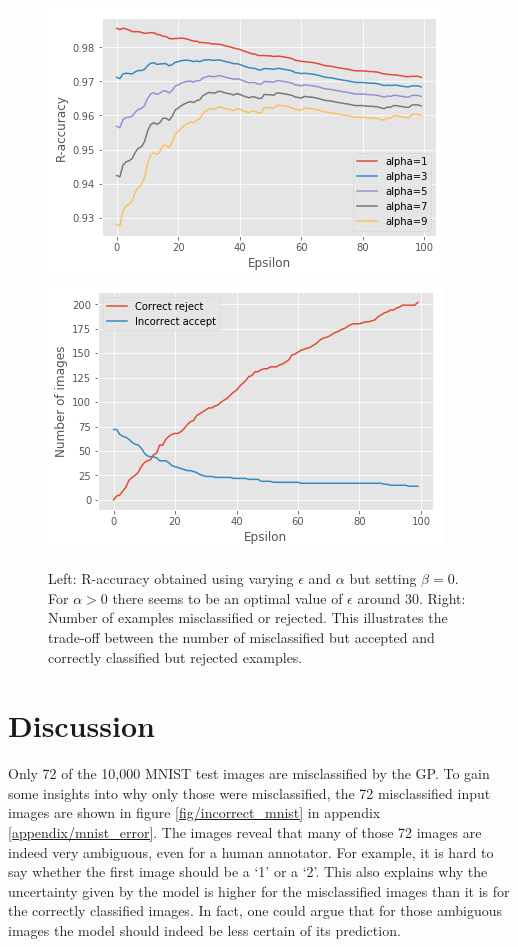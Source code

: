 \documentclass{article}
\begin{document}
\begin{figure}[h]
	\centering
	\includegraphics[scale=0.48]{r_accs_alpha_mnist}
	\includegraphics[scale=0.48]{r_acc_mnist}
	\caption{Left: R-accuracy obtained using varying $\epsilon$ and $\alpha$ but setting $\beta=0$. For $\alpha>0$ there seems to be an optimal value of $\epsilon$ around 30. Right: Number of examples misclassified or rejected. This illustrates the trade-off between the number of misclassified but accepted and correctly classified but rejected examples.}
	\label{fig/r_accs_alpha_mnist}
\end{figure}

\section{Discussion}
Only 72 of the 10,000 MNIST test images are misclassified by the GP. To gain some insights into why only those were misclassified, the 72 misclassified input images are shown in figure \ref{fig/incorrect_mnist} in appendix \ref{appendix/mnist_error}. The images reveal that many of those 72 images are indeed very ambiguous, even for a human annotator. For example, it is hard to say whether the first image should be a `1' or a `2'. This also explains why the uncertainty given by the model is higher for the misclassified images than it is for the correctly classified images. In fact, one could argue that for those ambiguous images the model should indeed be less certain of its prediction.
\end{document}
